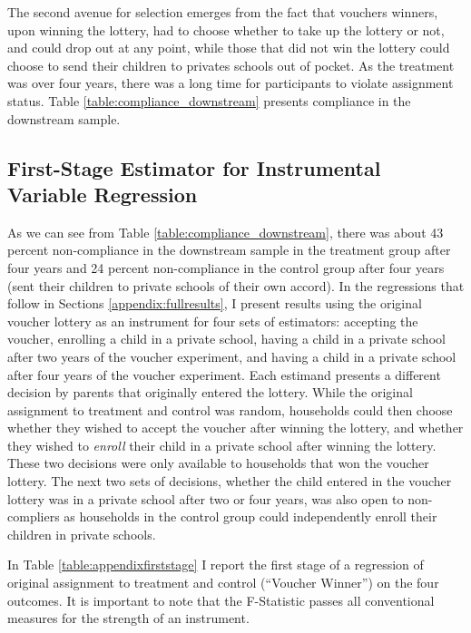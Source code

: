 \documentclass[hidelinks, 12pt, titlepage]{article}
\begin{document}
			The second avenue for selection emerges from the fact that vouchers winners, upon winning the lottery, had to choose whether to take up the lottery or not, and could drop out at any point, while those that did not win the lottery could choose to send their children to privates schools out of pocket.  As the treatment was over four years, there was a long time for participants to violate assignment status.  Table \ref{table:compliance_downstream} presents compliance in the downstream sample.

	\clearpage

	\subsection{First-Stage Estimator for Instrumental Variable Regression\label{appendix:firststage}}

		As we can see from Table \ref{table:compliance_downstream}, there was about 43 percent non-compliance in the downstream sample in the treatment group after four years and 24 percent non-compliance in the control group after four years (sent their children to private schools of their own accord).  In the regressions that follow in Sections \ref{appendix:fullresults}, I present results using the original voucher lottery as an instrument for four sets of estimators: accepting the voucher, enrolling a child in a private school, having a child in a private school after two years of the voucher experiment, and having a child in a private school after four years of the voucher experiment.  Each estimand presents a different decision by parents that originally entered the lottery.  While the original assignment to treatment and control was random, households could then choose whether they wished to accept the voucher after winning the lottery, and whether they wished to \emph{enroll} their child in a private school after winning the lottery.  These two decisions were only available to households that won the voucher lottery.  The next two sets of decisions, whether the child entered in the voucher lottery was in a private school after two or four years, was also open to non-compliers as households in the control group could independently enroll their children in private schools.

		In Table \ref{table:appendixfirststage} I report the first stage of a  regression of original assignment to treatment and control (``Voucher Winner'') on the four outcomes.  It is important to note that the F-Statistic passes all conventional measures for the strength of an instrument.
\end{document}
